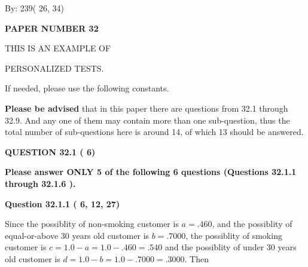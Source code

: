 \documentclass[12pt]{article}
\begin{document}
   
\hspace{1.0in} By: 
         239(         26,          34)
   
   
   
   
\newpage 
\setcounter{page}{ 
    32001 } 
   
   
   
   
 {\textbf{ \Large{ PAPER NUMBER          32 }}}
   
   
\vspace{0.2in}
   
   
   
   
   
   
 \vspace{0.2in}
 
 
{\Huge  THIS IS AN EXAMPLE OF}
 
{\Huge  PERSONALIZED TESTS. }
 
If needed, please use the following constants.
 
 
 
{\textbf{\large{Please be advised}}} that in this paper there are questions from
32.1 through
32.9.
And any one of them may contain more than one sub-question, thus the total number
of sub-questions here is around 14, of which
13 should be answered.
 
\vspace{0.3in}
 
 
   
   
  
\vspace{0.2in}
  
{\textbf{\Large{QUESTION
32.1 
 (          6)
}}}
  
  
{\textbf{\Large{Please answer ONLY  %
           5 %
 of the following  %
           6 %
 questions (Questions  %
32.1.1 %
 through  %
32.1.6 %
 ). }}}
   
   
  
\vspace{0.2in}
  
{\textbf{\Large{Question
32.1.1 
 (          6,         12,         27)
}}}
  
  
 
 

Since the possiblity of  %
 non-smoking customer is $ a =  %
.460 $,
and the possiblity of  %
equal-or-above 30 years old customer is $ b =  %
.7000 $,
the possiblity of  %
smoking customer is $ c = 1.0 - a = 1.0 -
.460
=  %
.540 $ and the possiblity of  %
under 30 years old
customer is $ d = 1.0 - b = 1.0 -  %
.7000 =  %
.3000  $.
Then
 
\end{document}
